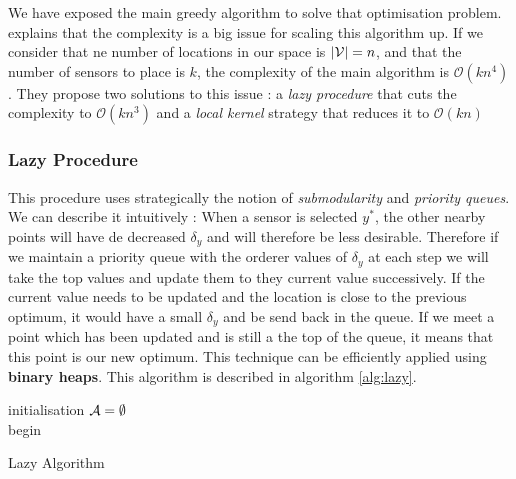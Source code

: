 \documentclass[12pt,twoside]{report}
\begin{document}

We have exposed the main greedy algorithm to solve that optimisation problem. \citet{krause_near-optimal_2008} explains that the complexity is a big issue for scaling this algorithm up. If we consider that ne number of locations in our space is $|\mathcal{V}| = n$, and that the number of sensors to place is $k$, the complexity of the main algorithm is $\mathcal{O}(kn^4)$. They propose two solutions to this issue : a \textit{lazy procedure} that cuts the complexity to  $\mathcal{O}(kn^3)$ and a \textit{local kernel} strategy that reduces it to $\mathcal{O}(kn)$

\subsubsection{Lazy Procedure} This procedure uses strategically the notion of \textit{submodularity} and \textit{priority queues}. We can describe it intuitively : When a sensor is selected $y^*$, the other nearby points will have de decreased $\delta_y$ and will therefore be less desirable. Therefore if we maintain a priority queue with the orderer values of $\delta_y$ at each step we will take the top values and update them to they current value successively. If the current value needs to be updated and the location is close to the previous optimum, it would have a small $\delta_y$ and be send back in the queue. If we meet a point which has been updated and is still a the top of the queue, it means that this point is our new optimum. This technique can be efficiently applied using \textbf{binary heaps}. This algorithm is described in algorithm \ref{alg:lazy}. \\ 


\begin{algorithm}[h]
 initialisation\;
 $\mathcal{A} = \emptyset$ \\
 begin\;
\caption{Lazy Algorithm}
\label{alg:lazy}
\end{algorithm}
\end{document}
